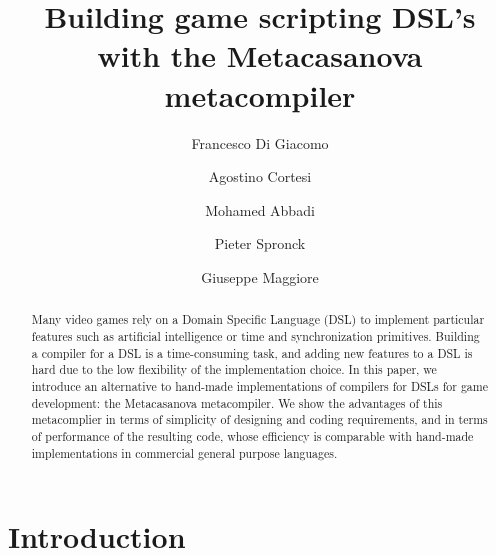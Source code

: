 \documentclass[lnicst]{svmultln}
\begin{document}
%
\mainmatter              %
%
\title{Building game scripting DSL's with the Metacasanova metacompiler}
%
%
\author{Francesco Di Giacomo \and Agostino Cortesi \and Mohamed Abbadi
\and Pieter Spronck
\and Giuseppe Maggiore}
%
%
%

\maketitle              %

\begin{abstract}
	Many video games rely on a Domain Specific Language (DSL) to implement
	particular features such as artificial intelligence or time and
	synchronization primitives.
	Building a compiler for a DSL is a time-consuming task, and adding new
	features to a DSL is hard  due to the low flexibility of the
	implementation choice.
	In this paper, we introduce an alternative to hand-made
	implementations of compilers for DSLs  for game development: the
	Metacasanova metacompiler.
	We show the advantages of this metacomplier  in terms of simplicity of
	designing and coding requirements, and in terms of  performance of the
	resulting code, whose efficiency is comparable with hand-made
	implementations in commercial general purpose languages.
\end{abstract}

\section{Introduction}
\label{sec:introduction}

\end{document}
